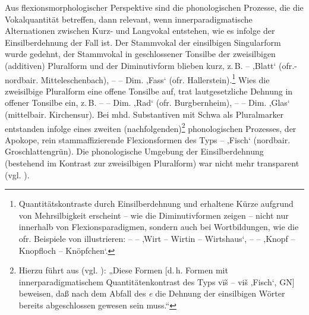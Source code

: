 Aus flexionsmorphologischer Perspektive sind die phonologischen Prozesse, die die Vokalquantität betreffen, dann relevant, wenn innerparadigmatische Alternationen zwischen Kurz- und Langvokal entstehen, wie es infolge der Einsilberdehnung der Fall ist. Der Stammvokal der einsilbigen Singularform wurde gedehnt, der Stammvokal in geschlossener Tonsilbe der zweisilbigen (additiven) Pluralform und der Diminutivform blieben kurz, z.\,B.  --  ‚Blatt‘ (ofr.-nordbair. Mitteleschenbach),  --  -- Dim.  ‚Fass‘ (ofr. Hallerstein).\footnote{Quantitätskontraste durch Einsilberdehnung und erhaltene Kürze aufgrund von Mehrsilbigkeit erscheint -- wie die Diminutivformen zeigen -- nicht nur innerhalb von Flexionsparadigmen, sondern auch bei Wortbildungen, wie die ofr. Beispiele von \citet[132]{Schübel1955} illustrieren:  --  --  ‚Wirt -- Wirtin -- Wirtshaus‘,  --  --  ‚Knopf -- Knopfloch -- Knöpfchen‘.}  Wies die zweisilbige Pluralform eine offene Tonsilbe auf, trat lautgesetzliche Dehnung in offener Tonsilbe ein, z.\,B.  --  -- Dim.  ‚Rad‘ (ofr. Burgbernheim),  --  -- Dim.  ‚Glas‘ (mittelbair. Kirchensur). Bei mhd. Substantiven mit Schwa als Pluralmarker entstanden infolge eines zweiten (nachfolgenden)\footnote{Hierzu führt \citet[§266]{Heilig1898} aus (vgl. \citealt[48]{Roth1940}): „Diese Formen [d.\,h. Formen mit innerparadigmatischem Quantitätenkontrast des Typs vīš -- viš ‚Fisch‘, GN] beweisen, daß nach dem Abfall des \textit{e} die Dehnung der einsilbigen Wörter bereits abgeschlossen gewesen sein muss.“}  phonologischen Prozesses, der Apokope, rein stammaffizierende Flexionsformen des Typs  --  ‚Fisch‘ (nordbair. Groschlattengrün). Die phonologische Umgebung der Einsilberdehnung (bestehend im Kontrast zur zweisilbigen Pluralform) war nicht mehr transparent (vgl. \citealt[188]{Seiler2008}).

